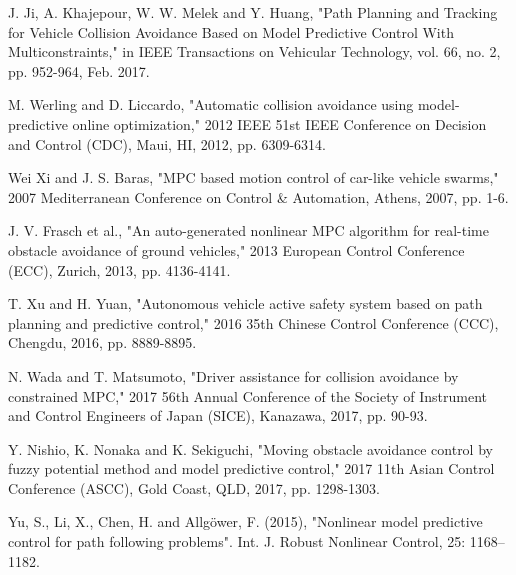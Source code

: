 \documentclass[conference, 11pt]{IEEEtran}
\begin{document}
\begin{thebibliography}{00}
	J. Ji, A. Khajepour, W. W. Melek and Y. Huang, "Path Planning and Tracking for Vehicle Collision Avoidance Based on Model Predictive Control With Multiconstraints," in IEEE Transactions on Vehicular Technology, vol. 66, no. 2, pp. 952-964, Feb. 2017.
	
	M. Werling and D. Liccardo, "Automatic collision avoidance using model-predictive online optimization," 2012 IEEE 51st IEEE Conference on Decision and Control (CDC), Maui, HI, 2012, pp. 6309-6314.
	
	Wei Xi and J. S. Baras, "MPC based motion control of car-like vehicle swarms," 2007 Mediterranean Conference on Control \& Automation, Athens, 2007, pp. 1-6.
	
	J. V. Frasch et al., "An auto-generated nonlinear MPC algorithm for real-time obstacle avoidance of ground vehicles," 2013 European Control Conference (ECC), Zurich, 2013, pp. 4136-4141.
	
	T. Xu and H. Yuan, "Autonomous vehicle active safety system based on path planning and predictive control," 2016 35th Chinese Control Conference (CCC), Chengdu, 2016, pp. 8889-8895.
	
	N. Wada and T. Matsumoto, "Driver assistance for collision avoidance by constrained MPC," 2017 56th Annual Conference of the Society of Instrument and Control Engineers of Japan (SICE), Kanazawa, 2017, pp. 90-93.
	
	Y. Nishio, K. Nonaka and K. Sekiguchi, "Moving obstacle avoidance control by fuzzy potential method and model predictive control," 2017 11th Asian Control Conference (ASCC), Gold Coast, QLD, 2017, pp. 1298-1303.
	
	Yu, S., Li, X., Chen, H. and Allgöwer, F. (2015), "Nonlinear model predictive control for path following problems". Int. J. Robust Nonlinear Control, 25: 1168–1182. 
\end{thebibliography}
\end{document}
